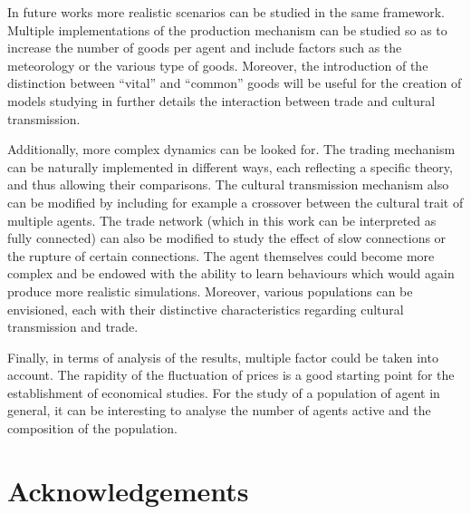 \documentclass{wscpaperproc}
\begin{document}

In future works more realistic scenarios can be studied in the same framework. Multiple implementations of the production mechanism can be studied so as to increase the number of goods per agent and include factors such as the meteorology or the various type of goods. Moreover, the introduction of the distinction between ``vital'' and ``common'' goods will be useful for the creation of models studying in further details the interaction between trade and cultural transmission. 

Additionally, more complex dynamics can be looked for. The trading mechanism can be naturally implemented in different ways, each reflecting a specific theory, and thus allowing their comparisons. The cultural transmission mechanism also can be modified by including for example a crossover between the cultural trait of multiple agents. The trade network (which in this work can be interpreted as fully connected) can also be modified to study the effect of slow connections or the rupture of certain connections. The agent themselves could become more complex and be endowed with the ability to learn behaviours which would again produce more realistic simulations. Moreover, various populations can be envisioned, each with their distinctive characteristics regarding cultural transmission and trade. 

Finally, in terms of analysis of the results, multiple factor could be taken into account. The rapidity of the fluctuation of prices is a good starting point for the establishment of economical studies. For the study of a population of agent in general, it can be interesting to analyse the number of agents active and the composition of the population.

\section{Acknowledgements}
\end{document}
